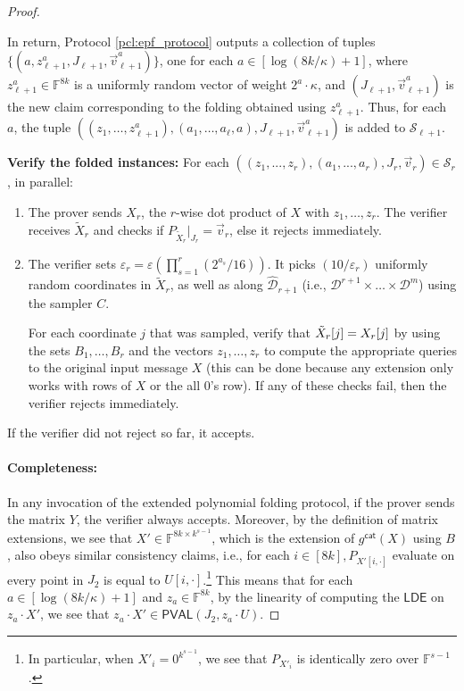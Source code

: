 \documentclass[11pt]{article}
\makeatletter
\newcommand{\PVAL}{\mathsf{PVAL}}
\newcommand{\LDE}{\mathsf{LDE}}
\newcommand{\F}{\mathbb{F}}
\newcommand{\sD}{\mathcal{D}}
\newenvironment{protocol}[1][htb]{
    \renewcommand{\ALG@name}{Protocol}
    \begin{algorithm}[#1]
    }{\end{algorithm}
}
\makeatother
\begin{document}
\begin{proof}
\begin{protocol}[htp]
\begin{algorithmic}{}
\begin{enumerate}
    In return, Protocol \ref{pcl:epf_protocol} outputs a collection of tuples $\{(a,z^a_{\ell+1},J_{\ell+1},\Vec{v}^a_{\ell+1})\}$, one for each $a \in [\log (8k/\kappa)+1]$, where $z^a_{\ell+1} \in \F^{8k}$ is a uniformly random vector of weight $2^a \cdot \kappa$, and $(J_{\ell+1},\Vec{v}^a_{\ell+1})$ is the new claim corresponding to the folding obtained using $z^a_{\ell+1}$. Thus, for each $a$, the tuple $((z_1, \dots, z^a_{\ell+1}),(a_1, \dots, a_\ell, a), J_{\ell+1}, \Vec{v}^a_{\ell+1})$ is added to $\mathcal{S}_{\ell+1}$.
\end{enumerate}
    
\STATE \textbf{Verify the folded instances:} For each $((z_{1}, . . . , z_{r}),(a_{1}, . . . , a_{r}), J_{r}, \vec{v}_{r}) \in \mathcal{S}_{r}$, in parallel:
\begin{enumerate}
    \item The prover sends $X_{r}$, the $r$-wise dot product of $X$ with $z_1, \dots, z_r$. The verifier receives $\widetilde{X}_{r}$ and checks if $P_{\widetilde{X}_{r}} \vert_{J_r} = \vec{v}_{r}$, else it rejects immediately.
    \item The verifier sets $\varepsilon_{r} = \varepsilon \left( \prod_{s=1}^{r}(2^{a_{s}}/16) \right)$. It picks $(10/\varepsilon_{r})$ uniformly random coordinates in $\widetilde{X}_{r}$, as well as along $\widehat{\sD}_{r+1}$ (i.e., $\sD^{r+1} \times \dots \times \sD^m$) using the sampler $C$. 
        
    For each coordinate $j$ that was sampled, verify that $\Tilde{X}_{r}[j] = X_r[j]$ by using the sets $B_1, \dots, B_r$ and the vectors $z_1, \dots, z_r$ to compute the appropriate queries to the original input message $X$ (this can be done because any extension only works with rows of $X$ or the all $0$'s row). If any of these checks fail, then the verifier rejects immediately.
\end{enumerate}
        
\STATE If the verifier did not reject so far, it accepts.
\end{algorithmic}
\end{protocol}

\paragraph*{Completeness:}  In any invocation of the extended polynomial folding protocol, if the prover sends the matrix $Y$, the verifier always accepts. Moreover, by the definition of matrix extensions, we see that $X' \in \F^{8k \times k^{s-1}}$, which is the extension of $g^{\mathsf{cat}}(X)$ using $B$, also obeys similar consistency claims, i.e., for each $i \in [8k], P_{X'[i,\cdot]}$
evaluate on every point in $J_2$ is equal to $U[i,\cdot]$.\footnote{In particular, when $X'_i = 0^{k^{s-1}}$, we see that $P_{X'_i}$ is identically zero over $\F^{s-1}$.} This means that for each $a \in [\log (8k/\kappa)+1]$ and $z_a \in \F^{8k}$, by the linearity of computing the $\LDE$ on $z_a \cdot X'$, we see that $z_a \cdot X' \in \PVAL(J_2, z_a \cdot U)$.


\end{proof}
\end{document}
